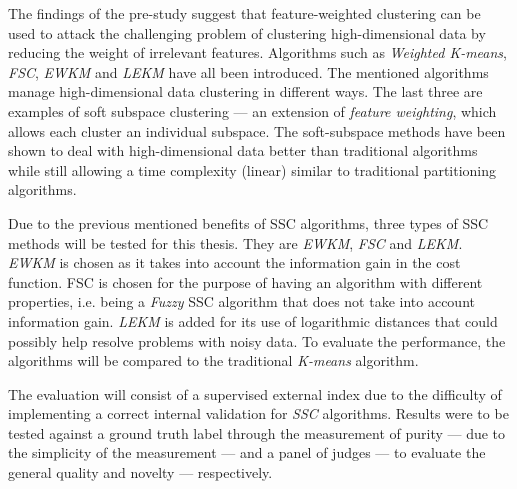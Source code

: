 \documentclass[../report.tex]{subfiles}
\begin{document}
The findings of the pre-study suggest that feature-weighted clustering can be used to attack the challenging problem of clustering high-dimensional data by reducing the weight of irrelevant features. Algorithms such as \textit{Weighted K-means}, \textit{FSC}, \textit{EWKM} and \textit{LEKM} have all been introduced.  The mentioned algorithms manage high-dimensional data clustering in different ways. The last three are examples of soft subspace clustering --- an extension of \textit{feature weighting}, which allows each cluster an individual subspace. The soft-subspace methods have been shown to deal with high-dimensional data better than traditional algorithms while still allowing a time complexity (linear) similar to traditional partitioning algorithms.\newline

Due to the previous mentioned benefits of SSC algorithms, three types of SSC methods will be tested for this thesis. They are \textit{EWKM}, \textit{FSC} and \textit{LEKM}. \textit{EWKM} is chosen as it takes into account the information gain in the cost function. FSC is chosen for the purpose of having an algorithm with different properties, i.e. being a \textit{Fuzzy} SSC algorithm that does not take into account information gain. \textit{LEKM} is added for its use of logarithmic distances that could possibly help resolve problems with noisy data. To evaluate the performance, the algorithms will be compared to the traditional \textit{K-means} algorithm.\newline

The evaluation will consist of a supervised external index due to the difficulty of implementing a correct internal validation for \textit{SSC} algorithms. Results were to be tested against a ground truth label through the measurement of purity --- due to the simplicity of the measurement --- and a panel of judges --- to evaluate the general quality and novelty --- respectively.\newline
\end{document}
